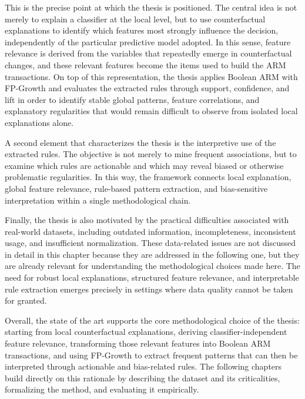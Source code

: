 This is the precise point at which the thesis is positioned. The central idea is not merely to explain a classifier at the local level, but to use counterfactual explanations to identify which features most strongly influence the decision, independently of the particular predictive model adopted. In this sense, feature relevance is derived from the variables that repeatedly emerge in counterfactual changes, and these relevant features become the items used to build the ARM transactions. On top of this representation, the thesis applies Boolean ARM with FP-Growth and evaluates the extracted rules through support, confidence, and lift in order to identify stable global patterns, feature correlations, and explanatory regularities that would remain difficult to observe from isolated local explanations alone.

A second element that characterizes the thesis is the interpretive use of the extracted rules. The objective is not merely to mine frequent associations, but to examine which rules are actionable and which may reveal biased or otherwise problematic regularities. In this way, the framework connects local explanation, global feature relevance, rule-based pattern extraction, and bias-sensitive interpretation within a single methodological chain.

Finally, the thesis is also motivated by the practical difficulties associated with real-world datasets, including outdated information, incompleteness, inconsistent usage, and insufficient normalization. These data-related issues are not discussed in detail in this chapter because they are addressed in the following one, but they are already relevant for understanding the methodological choices made here. The need for robust local explanations, structured feature relevance, and interpretable rule extraction emerges precisely in settings where data quality cannot be taken for granted.

Overall, the state of the art supports the core methodological choice of the thesis: starting from local counterfactual explanations, deriving classifier-independent feature relevance, transforming those relevant features into Boolean ARM transactions, and using FP-Growth to extract frequent patterns that can then be interpreted through actionable and bias-related rules. The following chapters build directly on this rationale by describing the dataset and its criticalities, formalizing the method, and evaluating it empirically.